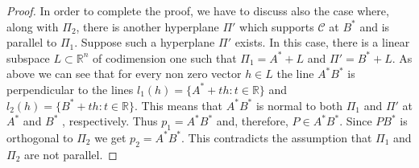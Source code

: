 \documentclass[10pt,a4paper]{amsart}
\begin{document}
\begin{proof}
 In order to complete the proof, we have to discuss also the case where, along with $\Pi_2$,  there is another hyperplane $\Pi'$
 which supports $\mathcal C$ at $B^*$ and is parallel to $\Pi_1$.
 Suppose such a hyperplane $\Pi'$ exists. In this case, there is a linear subspace $L \subset \mathbb R^n$ of codimension one such that $\Pi_1 = A^* + L$ and $\Pi' = B^* + L$.
As above we can see that for every non zero vector $h \in L$ the
line $A^*B^*$ is perpendicular to the lines $l_1(h)=\{A^* + th: t
\in \mathbb{R}\}$ and $l_2(h)=\{B^* + th: t \in \mathbb{R}\}$.
This means that $A^*B^*$ is normal to both $\Pi_1$ and $\Pi'$ at
$A^*$ and $B^*$ , respectively. Thus $p_1 = A^*B^* $ and,
therefore, $P \in A^*B^*$. Since $PB^*$ is orthogonal to $\Pi_2$
we get $p_2 = A^*B^*$. This contradicts the assumption that
$\Pi_1$ and $\Pi_2$ are not parallel.
 \end{proof}
\end{document}
